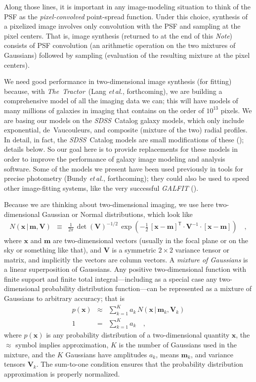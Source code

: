 \documentclass[12pt,pdftex,preprint]{aastex}
\newcommand{\foreign}[1]{\textit{#1}}
\newcommand{\etal}{\foreign{et\,al.}}
\newcommand{\documentname}{\textsl{Note}}
\newcommand{\project}[1]{\textsl{#1}}
\newcommand{\thetractor}{\project{The~Tractor}}
\newcommand{\sdss}{\project{SDSS}}
\newcommand{\tmatrix}[1]{\boldsymbol{#1}}
\newcommand{\inverse}[1]{{#1}^{-1}}
\newcommand{\transpose}[1]{{#1}^{\mathsf T}}
\newcommand{\tvector}[1]{\boldsymbol{#1}}
\newcommand{\pos}{\tvector{x}}
\newcommand{\mean}{\tvector{m}}
\newcommand{\var}{\tmatrix{V}\!}
\newcommand{\normal}{N}
\newcommand{\given}{\,|\,}
\begin{document}
Along those lines, it is important in any image-modeling situation to
think of the PSF as the \emph{pixel-convolved} point-spread function.
Under this choice, synthesis of a pixelized image involves only
convolution with the PSF and sampling at the pixel centers.  That is,
image synthesis (returned to at the end of this \documentname)
consists of PSF convolution (an arithmetic operation on the two
mixtures of Gaussians) followed by sampling (evaluation of the
resulting mixture at the pixel centers).

We need good performance in two-dimensional image synthesis (for
fitting) because, with \thetractor\ (Lang \etal, forthcoming), we are
building a comprehensive model of all the imaging data we can; this
will have models of many millions of galaxies in imaging that contains
on the order of $10^{13}$ pixels.  We are basing our models on the
\sdss\ Catalog galaxy models, which only include exponential,
de~Vaucouleurs, and composite (mixture of the two) radial profiles.
In detail, in fact, the \sdss\ Catalog models are small modifications
of these (\citealt{lupton}); details below.  So our goal here is to
provide replacements for these models in order to improve the
performance of galaxy image modeling and analysis software.  Some of
the models we present have been used previously in tools for precise
photometry (Bundy \etal, forthcoming); they could also be used to
speed other image-fitting systems, like the very successful
\project{GALFIT} (\citealt{galfit}).

Because we are thinking about two-dimensional imaging, we use here
two-dimensional Gaussian or Normal distributions, which look like
\begin{eqnarray}\displaystyle
\normal(\pos\given\mean,\var) &\equiv& \frac{1}{2\pi}\,\det(\var)^{-1/2}\,\exp(-\frac{1}{2}\,\transpose{[\pos-\mean]}\cdot\inverse{\var}\cdot[\pos-\mean])
\quad ,
\end{eqnarray}
where $\pos$ and $\mean$ are two-dimensional vectors (usually in the
focal plane or on the sky or something like that), and $\var$ is a
symmetric $2\times 2$ variance tensor or matrix, and implicitly the
vectors are column vectors.  A \emph{mixture of Gaussians} is a linear
superposition of Gaussians.  Any positive two-dimensional function
with finite support and finite total integral---including as a special
case any two-dimensional probability distribution function---can be
represented as a mixture of Gaussians to arbitrary accuracy; that is
\begin{eqnarray}
p(\pos) &\approx& \sum_{k=1}^K a_k\,\normal(\pos\given\mean_k,\var_k)
\\
1 &=& \sum_{k=1}^K a_k
\quad ,
\end{eqnarray}
where $p(\pos)$ is any probability distribution of a two-dimensional
quantity $\pos$, the $\approx$ symbol implies approximation, $K$ is
the number of Gaussians used in the mixture, and the $K$ Gaussians
have amplitudes $a_k$, means $\mean_k$, and variance tensors $\var_k$.
The sum-to-one condition ensures that the probability distribution
approximation is properly normalized.
\end{document}
